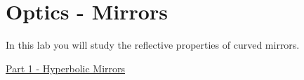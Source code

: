 
\section{Optics - Mirrors}

In this lab you will study the reflective properties of curved mirrors.

\hfill \break
\underline{Part 1 - Hyperbolic Mirrors}
\hfill \break


